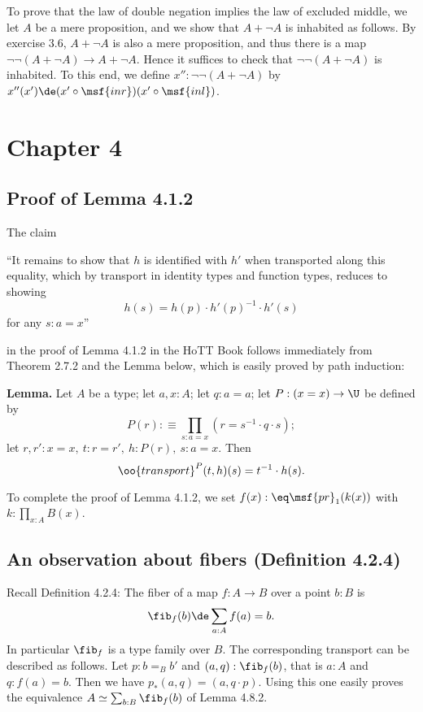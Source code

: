 \documentclass[12pt]{article}
\begin{document}
To prove that the law of double negation implies the law of excluded middle, we let $A$ be a mere proposition, and we show that $A+\neg A$ is inhabited as follows. By exercise 3.6, $A+\neg A$ is also a mere proposition, and thus there is a map $\neg\neg(A+\neg A)\to A+\neg A$. Hence it suffices to check that $\neg\neg(A+\neg A)$ is inhabited. To this end, we define $x'':\neg\neg(A+\neg A)$ by $x''(x')\de(x'\circ\msf{inr})(x'\circ\msf{inl})$.


\section{Chapter 4}

\subsection{Proof of Lemma 4.1.2}

The claim

\nn ``It remains to show that $h$ is identified with $h'$ when transported along this equality, which by transport in identity types and function types, reduces to showing 
$$
h(s)=h(p)\cdot h'(p)^{-1}\cdot h'(s)
$$ 
for any $s:a=x$''

\nn in the proof of Lemma 4.1.2 in the HoTT Book follows immediately from Theorem 2.7.2 and the Lemma below, which is easily proved by path induction:

\nn \textbf{Lemma.} Let $A$ be a type; let $a,x:A$; let $q:a=a$; let $P:(x=x)\to\U$ be defined by 
$$
P(r):\equiv\prod_{s:a=x}(r=s^{-1}\cdot q\cdot s);
$$ 
let $r,r':x=x,\ t:r=r',\ h:P(r),\ s:a=x$. Then 
$$
\oo{transport}^P(t,h)(s)=t^{-1}\cdot h(s).
$$ 

To complete the proof of Lemma 4.1.2, we set $f(x):\eq\msf{pr}_1(k(x))$ with $k:\prod_{x:A}B(x)$.


\subsection{An observation about fibers (Definition 4.2.4)}

\nn Recall Definition 4.2.4: The fiber of a map $f:A\to B$ over a point $b:B$ is 
$$
\fib_f(b)\de\sum_{a:A}f(a)=b.
$$ 
In particular $\fib_f$ is a type family over $B$. The corresponding transport can be described as follows. Let $p:b=_Bb'$ and $(a,q):\fib_f(b)$, that is $a:A$ and $q:f(a)=b$. Then we have $p_*(a,q)=(a,q\cdot p)$. Using this one easily proves the equivalence $A\simeq\sum_{b:B}\fib_f(b)$ of Lemma 4.8.2.
\end{document}
